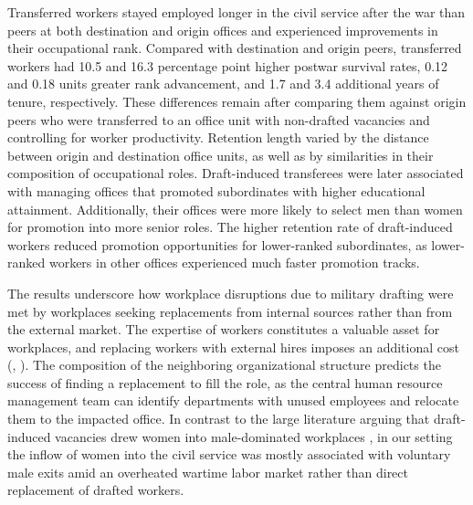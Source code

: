 Transferred workers stayed employed longer in the civil service after the war than peers at both destination and origin offices and experienced improvements in their occupational rank.
Compared with destination and origin peers, transferred workers had 10.5 and 16.3 percentage point higher postwar survival rates, 0.12 and 0.18 units greater rank advancement, and 1.7 and 3.4 additional years of tenure, respectively.
These differences remain after comparing them against origin peers who were transferred to an office unit with non-drafted vacancies and controlling for worker productivity.
Retention length varied by the distance between origin and destination office units, as well as by similarities in their composition of occupational roles.
Draft-induced transferees were later associated with managing offices that promoted subordinates with higher educational attainment.
Additionally, their offices were more likely to select men than women for promotion into more senior roles.
The higher retention rate of draft-induced workers reduced promotion opportunities for lower-ranked subordinates, as lower-ranked workers in other offices experienced much faster promotion tracks.


The results underscore how workplace disruptions due to military drafting were met by workplaces seeking replacements from internal sources rather than from the external market.
The expertise of workers constitutes a valuable asset for workplaces, and replacing workers with external hires imposes an additional cost (\cite{doi:10.1086/258715}, \cite{JaegerDeath}).
The composition of the neighboring organizational structure predicts the success of finding a replacement to fill the role, as the central human resource management team can identify departments with unused employees and relocate them to the impacted office.
In contrast to the large literature arguing that draft-induced vacancies drew women into male-dominated workplaces \citep{Goldin1991WWII, Acemoglu}, in our setting the inflow of women into the civil service was mostly associated with voluntary male exits amid an overheated wartime labor market rather than direct replacement of drafted workers.
